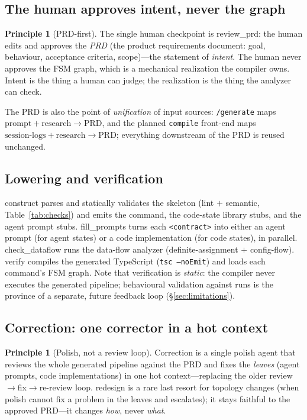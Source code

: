 \documentclass[11pt]{article}
\theoremstyle{plain}
\theoremstyle{definition}
\newtheorem{principle}[theorem]{Principle}
\theoremstyle{remark}
\newcommand{\code}[1]{\texttt{#1}}
\newcommand{\state}[1]{\textsf{#1}}
\begin{document}
\subsection{The human approves intent, never the graph}

\begin{principle}[PRD-first]\label{prin:prd}
The single human checkpoint is \state{review\_prd}: the human edits and approves the
\emph{PRD} (the product requirements document: goal, behaviour, acceptance
criteria, scope)---the statement of \emph{intent}. The human never approves the FSM
graph, which is a mechanical realization the compiler owns. Intent is the thing a
human can judge; the realization is the thing the analyzer can check.
\end{principle}

The PRD is also the point of \emph{unification} of input sources: \code{/generate}
maps $\text{prompt} + \text{research} \to \text{PRD}$, and the planned
\code{compile} front-end maps $\text{session-logs} + \text{research} \to
\text{PRD}$; everything downstream of the PRD is reused unchanged.

\subsection{Lowering and verification}

\state{construct} parses and statically validates the skeleton (lint $+$ semantic,
Table~\ref{tab:checks}) and emits the command, the code-state library stubs, and the
agent prompt stubs. \state{fill\_prompts} turns each \code{<contract>} into either
an agent prompt (for \state{agent} states) or a code implementation (for \state{code}
states), in parallel. \state{check\_dataflow} runs the data-flow analyzer
(definite-assignment $+$ config-flow). \state{verify} compiles the generated
TypeScript (\code{tsc --noEmit}) and loads each command's FSM graph. Note that
verification is \emph{static}: the compiler never executes the generated pipeline;
behavioural validation against runs is the province of a separate, future
feedback loop (\S\ref{sec:limitations}).

\subsection{Correction: one corrector in a hot context}\label{sec:lint}

\begin{principle}[Polish, not a review loop]\label{prin:polish}
Correction is a single \state{polish} agent that reviews the whole generated
pipeline against the PRD and fixes the \emph{leaves} (agent prompts, code
implementations) in one hot context---replacing the older
review$\to$fix$\to$re-review loop. \state{redesign} is a rare last resort for
topology changes (when \state{polish} cannot fix a problem in the leaves and
escalates); it stays faithful to the approved PRD---it changes \emph{how}, never
\emph{what}.
\end{principle}
\end{document}
